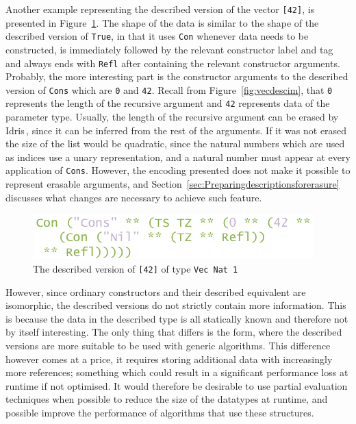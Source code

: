 \documentclass{ituthesis}
\newcommand{\ttconstructor}[1]{\textcolor{constructor-color}{\texttt{#1}}}
\newcommand{\tttype}[1]{\textcolor{type-color}{\texttt{#1}}}
\newcommand{\ttliteral}[1]{\textcolor{literal-color}{\texttt{#1}}}
\theoremstyle{break}
\begin{document}
Another example representing the described version of the vector \ttconstructor{[}\ttliteral{42}\ttconstructor{]}, is presented in Figure~\ref{fig:overheadlist}.
The shape of the data is similar to the shape of the described version of \ttconstructor{True}, in that it uses \ttconstructor{Con} whenever data needs to be constructed, is immediately followed by the relevant constructor label and tag and always ends with \ttconstructor{Refl}
after containing the relevant constructor arguments.
Probably, the more interesting part is the constructor arguments to the described version of \ttconstructor{Cons} which are \ttliteral{0} and \ttliteral{42}.
Recall from Figure~\ref{fig:vecdescim}, that \ttliteral{0} represents the length of the recursive argument and \ttliteral{42} represents data of the parameter type.
Usually, the length of the recursive argument can be erased by Idris\,\autocite{tejiscak2014erasure}, since it can be inferred from the rest of the arguments.
If it was not erased the size of the list would be quadratic, since the natural numbers which are used as indices use a unary representation, and a natural number must appear at every application of \ttconstructor{Cons}.
However, the encoding presented does not make it possible to represent erasable arguments, and Section~\ref{sec:Preparingdescriptionsforerasure} discusses what changes are necessary to achieve such feature.

\begin{figure}[ht]
\begin{center}
    \includegraphics[scale=0.5]{Figures/GenericsOverheadList.png}
\end{center}
\caption{The described version of \ttconstructor{[}\ttliteral{42}\ttconstructor{]} of type \tttype{Vec}~\tttype{Nat}~\ttliteral{1}}
\label{fig:overheadlist}
\end{figure}

However, since ordinary constructors and their described equivalent are isomorphic, the described versions do not strictly contain more information.
This is because the data in the described type is all statically known and therefore not by itself interesting.
The only thing that differs is the form, where the described versions are more suitable to be used with generic algorithms.
This difference however comes at a price, it requires storing additional data with increasingly more references; something which could result in a significant performance loss at runtime if not optimised.
It would therefore be desirable to use partial evaluation techniques when possible to reduce the size of the datatypes at runtime, and possible improve the performance of algorithms that use these structures.
\end{document}
